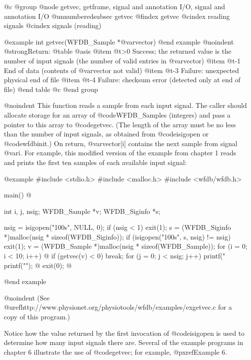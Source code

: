 {{{{{{{{{@c @group
@node    getvec, getframe, signal and annotation I/O, signal and annotation I/O
@unnumberedsubsec getvec
@findex getvec
@cindex reading signals
@cindex signals (reading)

@example
int getvec(WFDB_Sample *@var{vector})
@end example
@noindent
@strong{Return:}
@table @asis
@item @t{>0}
Success;  the returned value is the number of input signals (the number of
valid entries in @var{vector})
@item @t{-1}
End of data (contents of @var{vector} not valid)
@item @t{-3}
Failure: unexpected physical end of file
@item @t{-4}
Failure: checksum error (detected only at end of file)
@end table
@c @end group

@noindent
This function reads a sample from each input signal.  The caller should
allocate storage for an array of @code{WFDB_Sample}s (integers) and pass a
pointer to this array to @code{getvec}.  (The length of the array must
be no less than the number of input signals, as obtained from
@code{isigopen} or @code{wfdbinit}.)  On return, @var{vector[i]}
contains the next sample from signal @var{i}.  For example, this
modified version of the example from chapter 1 reads and prints the
first ten samples of each available input signal:

@example
#include <stdio.h>
#include <malloc.h>
#include <wfdb/wfdb.h>

main()
@{
    int i, j, nsig;
    WFDB_Sample *v;
    WFDB_Siginfo *s;

    nsig = isigopen("100s", NULL, 0);
    if (nsig < 1)
        exit(1);
    s = (WFDB_Siginfo *)malloc(nsig * sizeof(WFDB_Siginfo));
    if (isigopen("100s", s, nsig) != nsig)
        exit(1);
    v = (WFDB_Sample *)malloc(nsig * sizeof(WFDB_Sample));
    for (i = 0; i < 10; i++) @{
        if (getvec(v) < 0)
            break;
        for (j = 0; j < nsig; j++)
            printf("%
        printf("\n");
    @}
    exit(0);
@}
@end example

@noindent
(See @uref{http://www.physionet.org/physiotools/wfdb/examples/exgetvec.c}
for a copy of this program.)

Notice how the value returned by the first invocation of @code{isigopen}
is used to determine how many input signals there are.  Several of the
example programs in chapter 6 illustrate the use of @code{getvec}; for
example, @pxref{Example 6}.

}}}}}}}}}
